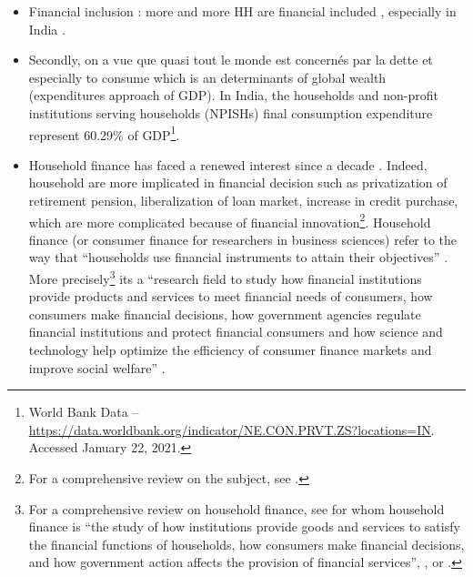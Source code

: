 \documentclass[a4paper, 11pt, onecolumn]{article}
\begin{document}
\citep{GuerinDemo2017, Guerin2020}

\begin{itemize}
\item Financial inclusion : more and more HH are financial included \citep{Badarinza2019}, especially in India \citep{Chakravartya2013}. 
\item Secondly, on a vue que quasi tout le monde est concernés par la dette et especially to consume which is an determinants of global wealth (expenditures approach of GDP).
In India, the households and non-profit institutions serving households (NPISHs) final consumption expenditure represent 60.29\% of GDP\footnote{World Bank Data -- \url{https://data.worldbank.org/indicator/NE.CON.PRVT.ZS?locations=IN}. Accessed January 22, 2021.}.
\item Household finance has faced a renewed interest since a decade \citep{Guiso2013}.
Indeed, household are more implicated in financial decision such as privatization of retirement pension, liberalization of loan market, increase in credit purchase, which are more complicated because of financial innovation\footnote{For a comprehensive review on the subject, see \cite{Tufano2003}.}.
Household finance (or consumer finance for researchers in business sciences) refer to the way that ``households use financial instruments to attain their objectives'' \citep{Campbell2006}.
More precisely\footnote{For a comprehensive review on household finance, see \cite{Tufano2009} for whom household finance is ``the study of how institutions provide goods and services to satisfy the financial functions of households, how consumers make financial decisions, and how government action affects the provision of financial services'', \cite{Guiso2013}, or \cite{Xiao2020}.}  its a ``research field to study how financial institutions provide products and services to meet financial needs of consumers, how consumers make financial decisions, how government agencies regulate financial institutions and protect financial consumers and how science and technology help optimize the efficiency of consumer finance markets and improve social welfare'' \citep{Xiao2020}.
\end{itemize}





\end{document}
